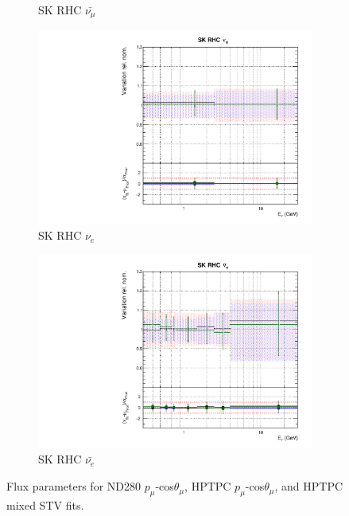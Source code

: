 \begin{figure}[t]
\begin{subfigure}{0.24\textwidth}
  \caption{SK RHC $\bar{\nu_{\mu}}$}
\end{subfigure}
\begin{subfigure}{0.24\textwidth}
  \centering
  \includegraphics[width=0.95\linewidth]{figs/hptpcfitsflux_14}
  \caption{SK RHC $\nu_{e}$}
\end{subfigure}
\begin{subfigure}{0.24\textwidth}
  \centering
  \includegraphics[width=0.95\linewidth]{figs/hptpcfitsflux_15}
  \caption{SK RHC $\bar{\nu_e}$}
\end{subfigure}
\caption{Flux parameters for ND280 $p_{\mu}$-cos$\theta_{\mu}$, HPTPC $p_{\mu}$-cos$\theta_{\mu}$, and HPTPC mixed STV fits.}
\label{fig:hptpcflux}
\end{figure}

